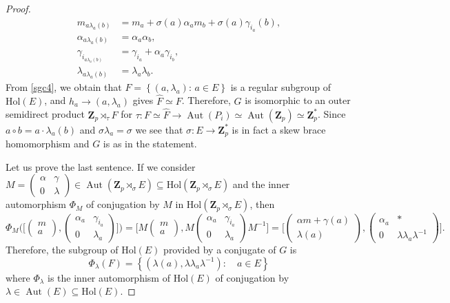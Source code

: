 \documentclass[12pt]{article}
\theoremstyle{definition}
\newcommand{\Z}{\mathbf Z}
\newcommand{\Hol}{\mathrm{Hol}}
\newcommand{\Aut}{\operatorname{Aut}}
\begin{document}
\begin{proof}
\begin{align}
m_{a\lambda_a(b)}&=m_a+\sigma(a)\alpha_am_b+\sigma(a)\gamma_{i_a}(b),\label{sgc1}\\
\alpha_{a\lambda_a(b)}&=\alpha_a\alpha_b,\\
\gamma_{i_{a\lambda_a(b)}}&=\gamma_{i_a}+\alpha_a\gamma_{i_b}, \label{sgc3} \\
\lambda_{a\lambda_a(b)}&=\lambda_a\lambda_b. \label{sgc4}
\end{align}
From \ref{sgc4}, we obtain that  $F=\left\{
		(a, \lambda_a) :\, a\in E
		\right\}
		$
		is a regular subgroup of $\Hol(E)$, and $h_a\to (a,\lambda_a)$ gives $\hat F\simeq F$. 
        Therefore, $G$ is isomorphic to an outer semidirect product $\Z_p\rtimes_{\tau} F$ for 
        $\tau:F\simeq \hat F\to \Aut(P_i)\simeq \Aut(\Z_p)\simeq \Z_p^*$.
        Since
		$a\circ b=a\cdot \lambda_a(b)$ and $\sigma\lambda_a=\sigma$ we see that $\sigma:E\to \Z_p^*$ is in fact a skew brace homomorphism and $G$ is as in the statement.
  
Let us prove the last sentence. If we consider  $
		M=\begin{pmatrix}
		\alpha & \gamma\\
		0&\lambda
		\end{pmatrix}
		\in\Aut(\Z_p\rtimes_{\sigma} E)\subseteq \Hol(\Z_p\rtimes_{\sigma} E)$
	and the inner automorphism $\Phi_M$ of conjugation by $M$ in $\Hol(\Z_p\rtimes_{\sigma}E)$, then
		$$
		\Phi_M \Big(\Big[\begin{pmatrix}
		m\\
		a
		\end{pmatrix},\begin{pmatrix}
		\alpha_a & \gamma_{i_a}\\
		0&\lambda_a
		\end{pmatrix}\Big]\Big)=\Big[M\begin{pmatrix}
		m\\
		a
		\end{pmatrix},M\begin{pmatrix}
		\alpha_a & \gamma_{i_a}\\
		0&\lambda_a
		\end{pmatrix}M^{-1} \Big]=\Big[\begin{pmatrix}
		\alpha m+\gamma(a)\\
		\lambda(a)
		\end{pmatrix}, \begin{pmatrix}
		\alpha_a & *\\
		0&\lambda\lambda_a\lambda^{-1}
		\end{pmatrix}\Big].
		$$
	Therefore, the subgroup of $\Hol(E)$ provided by a conjugate of $G$ is 
		$$
		\Phi_{\lambda}(F)=\left\{
		(\lambda(a), \lambda\lambda_a\lambda^{-1}) :\quad a\in E
		\right\}
		$$
        where $\Phi_{\lambda}$ is the inner automorphism of $\Hol(E)$ of conjugation by $\lambda\in\Aut(E)\subseteq \Hol(E).$
\end{proof}
	
\end{document}
